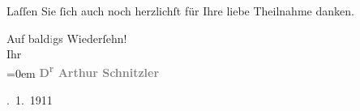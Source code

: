 \pstart
           Laſſen Sie ſich auch noch herzlichſt für Ihre liebe Theilnahme danken.\pend
           
\pstart
           {\pb}Auf bald\textcolor{gray}{i}gs Wiederſehn!{\\[\baselineskip]}Ihr{\\[\baselineskip]}\pend
           \leftskip=0em{}
\pstart
           \noindent{}\centering{}\textcolor{gray}{\textbf{D\textsuperscript{r} Arthur
                     Schnitzler }}\pend
           
. 1. 1911\pend
           \endnumbering{}  
      